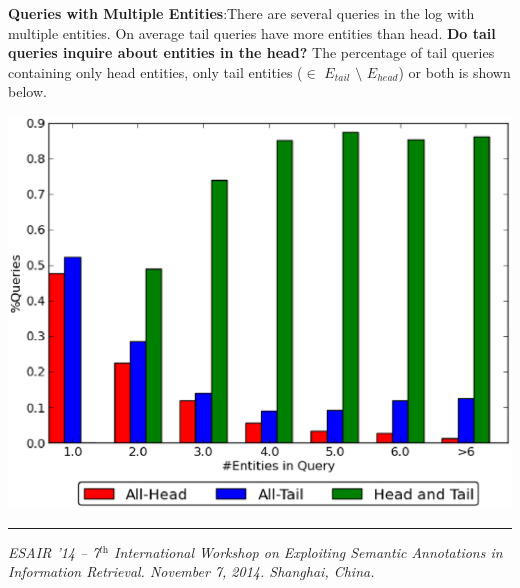 \documentclass[a0,portrait,final]{a0poster}
\newcommand{\etail}[1]{$E_{tail}${}}
\newcommand{\ehead}[1]{$E_{head}${}}
\begin{document}
\begin{multicols}{2}
\textbf{Queries with Multiple Entities}:There are several queries in the log with multiple entities. 
	On average tail queries have more entities than head. \textbf{Do tail queries inquire about entities in the head?} The percentage of 		tail queries containing only head entities, only tail entities ($\in$ \etail{} $\setminus$ \ehead{}) or both is shown below.
	
	
		
		\vspace{10mm}
		\begin{center}
		\includegraphics[width=0.7\columnwidth]{img/entity-head-tail-count.eps}
		\label{img:headTailEntPercent}
		\end{center}




\end{multicols}
\vfill
\centering
\begin{minipage}[c]{\textwidth}
\rule{\textwidth}{1pt}
\textit{ESAIR '14  -- 7$^\textit{th}$ International Workshop on Exploiting Semantic Annotations in Information Retrieval. November 7, 2014. Shanghai, China.}
\end{minipage}
\end{document}
